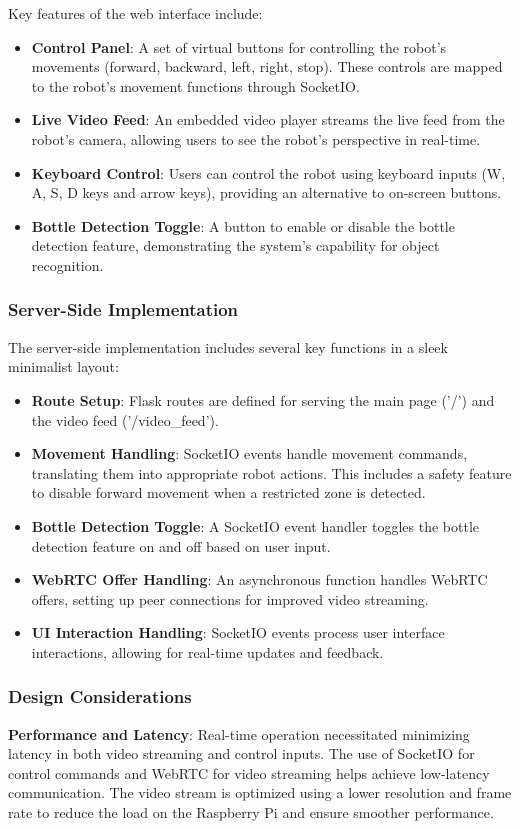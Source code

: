 Key features of the web interface include:
\begin{itemize}
	\item \textbf{Control Panel}: A set of virtual buttons for controlling the robot's movements (forward, backward, left, right, stop). These controls are mapped to the robot's movement functions through SocketIO.
	\item \textbf{Live Video Feed}: An embedded video player streams the live feed from the robot's camera, allowing users to see the robot's perspective in real-time.
	\item \textbf{Keyboard Control}: Users can control the robot using keyboard inputs (W, A, S, D keys and arrow keys), providing an alternative to on-screen buttons.
	\item \textbf{Bottle Detection Toggle}: A button to enable or disable the bottle detection feature, demonstrating the system's capability for object recognition.
\end{itemize}

\subsubsection{Server-Side Implementation}
The server-side implementation includes several key functions in a sleek minimalist layout:

\begin{itemize}
	\item \textbf{Route Setup}: Flask routes are defined for serving the main page ('/') and the video feed ('/video\_feed').
	\item \textbf{Movement Handling}: SocketIO events handle movement commands, translating them into appropriate robot actions. This includes a safety feature to disable forward movement when a restricted zone is detected.
	\item \textbf{Bottle Detection Toggle}: A SocketIO event handler toggles the bottle detection feature on and off based on user input.
	\item \textbf{WebRTC Offer Handling}: An asynchronous function handles WebRTC offers, setting up peer connections for improved video streaming.
	\item \textbf{UI Interaction Handling}: SocketIO events process user interface interactions, allowing for real-time updates and feedback.
\end{itemize}

\subsubsection{Design Considerations}
\textbf{Performance and Latency}: Real-time operation necessitated minimizing latency in both video streaming and control inputs. The use of SocketIO for control commands and WebRTC for video streaming helps achieve low-latency communication. The video stream is optimized using a lower resolution and frame rate to reduce the load on the Raspberry Pi and ensure smoother performance.

